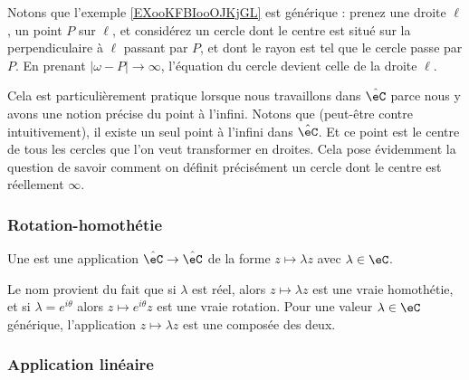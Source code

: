 \begin{normaltext}\label{NORMooCXVJooMTMqEU}
Notons que l'exemple \ref{EXooKFBIooOJKjGL} est générique : prenez une droite \( \ell\), un point \( P\) sur \( \ell\), et considérez un cercle dont le centre est situé sur la perpendiculaire à \( \ell\) passant par \( P\), et dont le rayon est tel que le cercle passe par \( P\). En prenant \( | \omega-P |\to \infty\), l'équation du cercle devient celle de la droite \( \ell\).

Cela est particulièrement pratique lorsque nous travaillons dans \( \hat \eC\) parce nous y avons une notion précise du point à l'infini. Notons que (peut-être contre intuitivement), il existe un seul point à l'infini dans \( \hat \eC\). Et ce point est le centre de tous les cercles que l'on veut transformer en droites. Cela pose évidemment la question de savoir comment on définit précisément un cercle dont le centre est réellement \( \infty\).
\end{normaltext}


\begin{center}
   
\end{center}

\subsubsection{Rotation-homothétie}

\begin{definition}
    Une  est une application \(  \hat \eC \to \hat \eC\) de la forme \( z\mapsto \lambda z\) avec \( \lambda\in \eC\).
\end{definition}
Le nom provient du fait que si \( \lambda\) est réel, alors \( z\mapsto \lambda z\) est une vraie homothétie, et si \( \lambda= e^{i\theta}\) alors \( z\mapsto  e^{i\theta}z\) est une vraie rotation. Pour une valeur \( \lambda\in \eC\) générique, l'application \( z\mapsto \lambda z\) est une composée des deux.

\subsubsection{Application linéaire}
\label{SSUBSooRBCWooSCIQEL}

